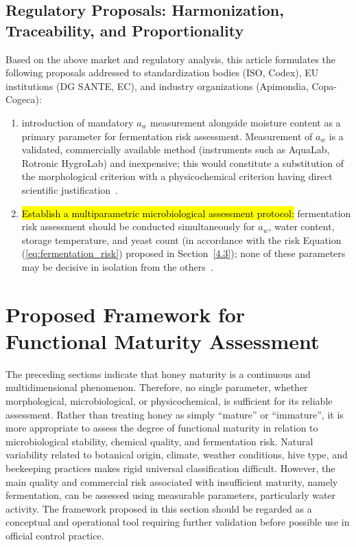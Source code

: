 \documentclass[foods,review,accept,pdftex,moreauthors]{Definitions/mdpi}
\begin{document}
{\subsection{Regulatory Proposals: Harmonization, Traceability, and Proportionality}


Based on the above market and regulatory analysis, this article
formulates the following proposals addressed to standardization
bodies (ISO, Codex), EU institutions (DG SANTE, EC), and industry
organizations (Apimondia, Copa-Cogeca):

\begin{enumerate}
    \item {}
          introduction of mandatory $a_w$ measurement alongside
          moisture content as a primary parameter for fermentation
          risk assessment. Measurement of $a_w$ is a validated,
          commercially available method (instruments such as
          AquaLab, Rotronic HygroLab) and inexpensive; this would
          constitute a substitution of the morphological criterion
          with a physicochemical criterion having direct scientific
          justification~\cite{ruegg1981,zamora2006}.

    \item \hl{Establish 
 a multiparametric microbiological
          assessment protocol:} fermentation risk assessment should
          be conducted simultaneously for $a_w$, water content,
          storage temperature, and yeast count (in accordance with
          the risk Equation (\ref{eq:fermentation_risk}) proposed
          in Section~\ref{4.3}); none of these parameters may be
          decisive in isolation from the
          others~\cite{analytica2020,apinz2021}.


\end{enumerate}






\section{Proposed Framework for Functional Maturity Assessment}

The preceding sections indicate that honey maturity is a continuous and multidimensional phenomenon. Therefore, no single parameter, whether morphological, microbiological, or physicochemical, is sufficient for its reliable assessment. Rather than treating honey as simply “mature” or “immature”, it is more appropriate to assess the degree of functional maturity in relation to microbiological stability, chemical quality, and fermentation risk. Natural variability related to botanical origin, climate, weather conditions, hive type, and beekeeping practices makes rigid universal classification difficult. However, the main quality and commercial risk associated with insufficient maturity, namely fermentation, can be assessed using measurable parameters, particularly water activity. The framework proposed in this section should be regarded as a conceptual and operational tool requiring further validation before possible use in official control practice.



}
\end{document}
